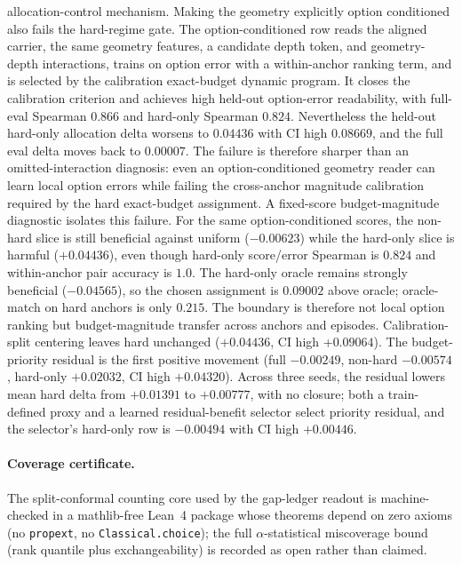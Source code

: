 allocation-control mechanism.  Making the geometry explicitly option
conditioned also fails the hard-regime gate.  The option-conditioned row reads
the aligned carrier, the same geometry features, a candidate depth token, and
geometry-depth interactions, trains on option error with a within-anchor
ranking term, and is selected by the calibration exact-budget dynamic program.
It closes the calibration criterion and achieves high held-out option-error
readability, with full-eval Spearman $0.866$ and hard-only Spearman $0.824$.
Nevertheless the held-out hard-only allocation delta worsens to $0.04436$ with
CI high $0.08669$, and the full eval delta moves back to $0.00007$.  The
failure is therefore sharper than an omitted-interaction diagnosis: even an
option-conditioned geometry reader can learn local option errors while failing
the cross-anchor magnitude calibration required by the hard exact-budget
assignment.  A fixed-score budget-magnitude diagnostic isolates this failure.
For the same option-conditioned scores, the non-hard slice is still beneficial
against uniform ($-0.00623$) while the hard-only slice is harmful
($+0.04436$), even though hard-only score/error Spearman is $0.824$ and
within-anchor pair accuracy is $1.0$.  The hard-only oracle remains strongly
beneficial ($-0.04565$), so the chosen assignment is $0.09002$ above oracle;
oracle-match on hard anchors is only $0.215$.  The boundary is therefore not
local option ranking but budget-magnitude transfer across anchors and episodes.
Calibration-split centering leaves hard unchanged ($+0.04436$, CI high $+0.09064$).
The budget-priority residual is the first positive movement (full $-0.00249$,
non-hard $-0.00574$, hard-only $+0.02032$, CI high $+0.04320$).  Across three
seeds, the residual lowers mean hard delta from $+0.01391$ to $+0.00777$, with
no closure; both a train-defined proxy and a learned residual-benefit selector
select priority residual, and the selector's hard-only row is $-0.00494$ with CI high $+0.00446$.

\paragraph{Coverage certificate.}
The split-conformal counting core used by the gap-ledger readout is
machine-checked in a mathlib-free Lean~4 package whose theorems depend on
zero axioms (no \texttt{propext}, no \texttt{Classical.choice}); the full
$\alpha$-statistical miscoverage bound (rank quantile plus exchangeability)
is recorded as open rather than claimed.

